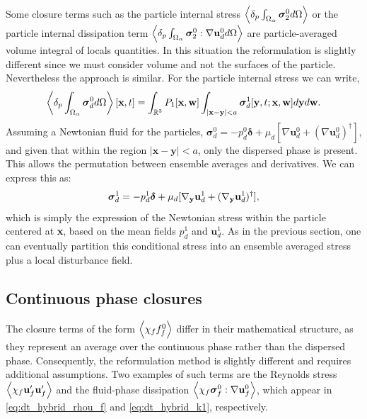 Some closure terms such as the particle internal stress $\left<\delta_p \int_{\Omega_{\alpha}} \bm{\sigma}_2^0 d\Omega\right>$ or the particle internal dissipation term $\left<\delta_p \int_{\Omega_{\alpha}} \bm{\sigma}_2^0:\mathbf{\nabla} \textbf{u}_d^0 d\Omega\right>$ are particle-averaged volume integral of locals quantities. 
In this situation the reformulation is slightly different since we must consider volume and not the surfaces of the particle.  Nevertheless the approach is similar. 
For the particle internal stress we can write, 
\begin{equation}
    \pOavg{\bm\sigma_d^0}[\textbf{x},t]
    =
    \int_{\mathbb{R}^3}
    P_1[\textbf{x},\textbf{w}]
    \int_{|\textbf{x}-\textbf{y}|<a}
    \bm\sigma_d^1[\textbf{y},t;\textbf{x},\textbf{w}] 
    d\textbf{y}
    d\textbf{w}. 
    \label{eq:conditionally_averaged_vol}
\end{equation}
Assuming a Newtonian fluid for the particles, $\bm\sigma_d^0 = -p_d^0 \bm\delta + \mu_d [\nabla \textbf{u}_d^0 + (\nabla \textbf{u}_d^0)^\dagger]$, and given that within the region $|\textbf{x} - \textbf{y}| < a$, only the dispersed phase is present.
This allows the permutation between ensemble averages and derivatives.
We can express this as:
\begin{equation}
    \bm\sigma_d^1  
    = 
    -p_d^1   \bm\delta
    + \mu_d  [\pddy \textbf{u}^1_d+(\pddy  \textbf{u}^1_d)^\dagger],
    \label{eq:dispersed_phase_stress}
\end{equation}
which is simply the expression of the Newtonian stress within the particle centered at \textbf{x}, based on the mean fields $p_d^1$ and $\textbf{u}_d^1$. 
As in the previous section, one can eventually partition this conditional stress into an ensemble averaged stress plus a local disturbance field. 

\subsection{Continuous phase closures}

The closure terms of the form $\left<\chi_f f_f^0\right>$ differ in their mathematical structure, as they represent an average over the continuous phase rather than the dispersed phase. 
Consequently, the reformulation method is slightly different and requires additional assumptions. Two examples of such terms are the Reynolds stress $\left<\chi_f \textbf{u}_f'\textbf{u}_f'\right>$ and the fluid-phase dissipation $\left<\chi_f \bm\sigma_f^0 : \nabla \textbf{u}_f^0\right>$, which appear in \ref{eq:dt_hybrid_rhou_f} and \ref{eq:dt_hybrid_k1}, respectively.  


